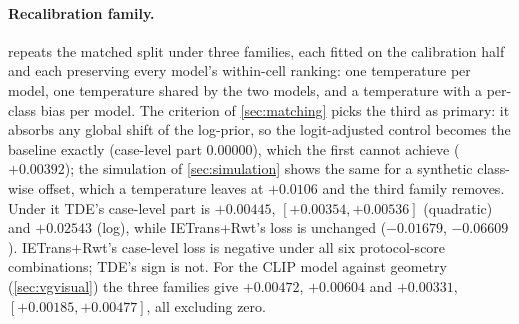 \paragraph{Recalibration family.}  repeats the matched split under
three families, each fitted on the calibration half and each preserving every model's
within-cell ranking: one temperature per model, one temperature shared by the two models, and
a temperature with a per-class bias per model. The criterion of \cref{sec:matching} picks the
third as primary: it absorbs any global shift of the log-prior, so the logit-adjusted control
becomes the baseline exactly (case-level part $0.00000$), which the first cannot achieve
($+0.00392$); the simulation of \cref{sec:simulation} shows the same for a synthetic
class-wise offset, which a temperature leaves at $+0.0106$ and the third family removes. Under
it TDE's case-level part is $+0.00445$, $[+0.00354,+0.00536]$ (quadratic) and $+0.02543$ (log),
while IETrans+Rwt's loss is unchanged ($-0.01679$, $-0.06609$). IETrans+Rwt's case-level loss
is negative under all six protocol-score combinations; TDE's sign is not. For the CLIP model
against geometry (\cref{sec:vgvisual}) the three families give $+0.00472$, $+0.00604$ and
$+0.00331$, $[+0.00185,+0.00477]$, all excluding zero.

